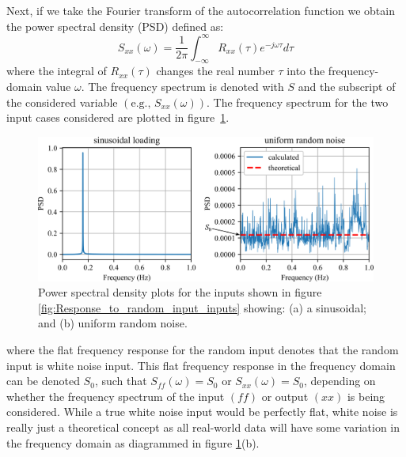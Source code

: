 \documentclass[12pt,letter]{article}
\begin{document}
Next, if we take the Fourier transform of the autocorrelation function we obtain the power spectral density (PSD) defined as:
\begin{equation}
S_{xx}(\omega) =\frac{1}{2 \pi} \int_{-\infty}^{\infty} R_{xx}(\tau) e^{-j \omega \tau}d \tau
\end{equation}
where the integral of $R_{xx}(\tau)$ changes the real number $\tau$ into the frequency-domain value $\omega$. The frequency spectrum is denoted with $S$ and the subscript of the considered variable $(\text{e.g., }S_{xx}(\omega))$.  The frequency spectrum for the two input cases considered are plotted in figure~\ref{fig:Response_to_random_input_PSD}.
\begin{figure}[H]
	\centering
	\includegraphics[width=1\textwidth]{../figures/Response_to_random_input_PSD.png}
	\caption{Power spectral density plots for the inputs shown in figure \ref{fig:Response_to_random_input_inputs} showing: (a) a sinusoidal; and (b) uniform random noise.}
	\label{fig:Response_to_random_input_PSD}
\end{figure}
\noindent where the flat frequency response for the random input denotes that the random input is white noise input.  This flat frequency response in the frequency domain can be denoted $S_0$, such that $S_{ff}(\omega) = S_0$ or $S_{xx}(\omega) = S_0$, depending on whether the frequency spectrum of the input $(ff)$ or output  $(xx)$ is being considered. While a true white noise input would be perfectly flat, white noise is really just a theoretical concept as all real-world data will have some variation in the frequency domain as diagrammed in figure \ref{fig:Response_to_random_input_PSD}(b). 
\end{document}
